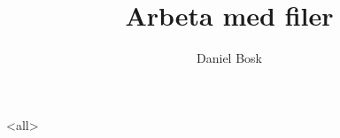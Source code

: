 \documentclass[ignoreframetext]{beamer}
\begin{document}
\title{%
  Arbeta med filer
}
\author{Daniel Bosk}

\begin{frame}
  \maketitle
\end{frame}

\mode<all>

\mode*
%
\end{document}
